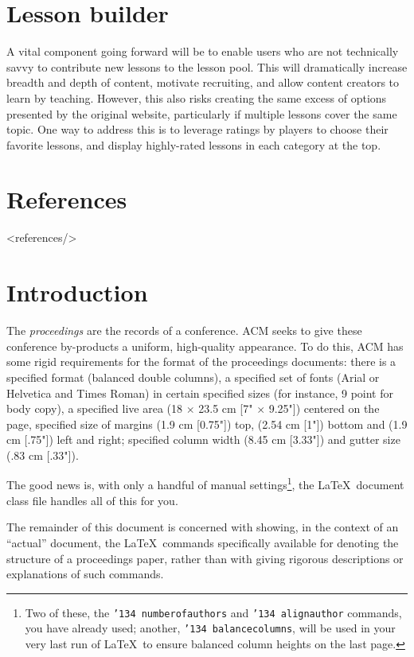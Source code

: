 \documentclass{acm_proc_article-sp}
\begin{document}
\section{Lesson builder}

A vital component going forward will be to enable users who are not technically savvy to contribute new lessons to the lesson pool. This will dramatically increase breadth and depth of content, motivate recruiting, and allow content creators to learn by teaching. However, this also risks creating the same excess of options presented by the original website, particularly if multiple lessons cover the same topic. One way to address this is to leverage ratings by players to choose their favorite lessons, and display highly-rated lessons in each category at the top.

\section{References}
<references/>


\section{Introduction}
The \textit{proceedings} are the records of a conference.
ACM seeks to give these conference by-products a uniform,
high-quality appearance.  To do this, ACM has some rigid
requirements for the format of the proceedings documents: there
is a specified format (balanced  double columns), a specified
set of fonts (Arial or Helvetica and Times Roman) in
certain specified sizes (for instance, 9 point for body copy),
a specified live area (18 $\times$ 23.5 cm [7" $\times$ 9.25"]) centered on
the page, specified size of margins (1.9 cm [0.75"]) top, (2.54 cm [1"]) bottom
and (1.9 cm [.75"]) left and right; specified column width
(8.45 cm [3.33"]) and gutter size (.83 cm [.33"]).

The good news is, with only a handful of manual
settings\footnote{Two of these, the {\texttt{\char'134 numberofauthors}}
and {\texttt{\char'134 alignauthor}} commands, you have
already used; another, {\texttt{\char'134 balancecolumns}}, will
be used in your very last run of \LaTeX\ to ensure
balanced column heights on the last page.}, the \LaTeX\ document
class file handles all of this for you.

The remainder of this document is concerned with showing, in
the context of an ``actual'' document, the \LaTeX\ commands
specifically available for denoting the structure of a
proceedings paper, rather than with giving rigorous descriptions
or explanations of such commands.
\end{document}
